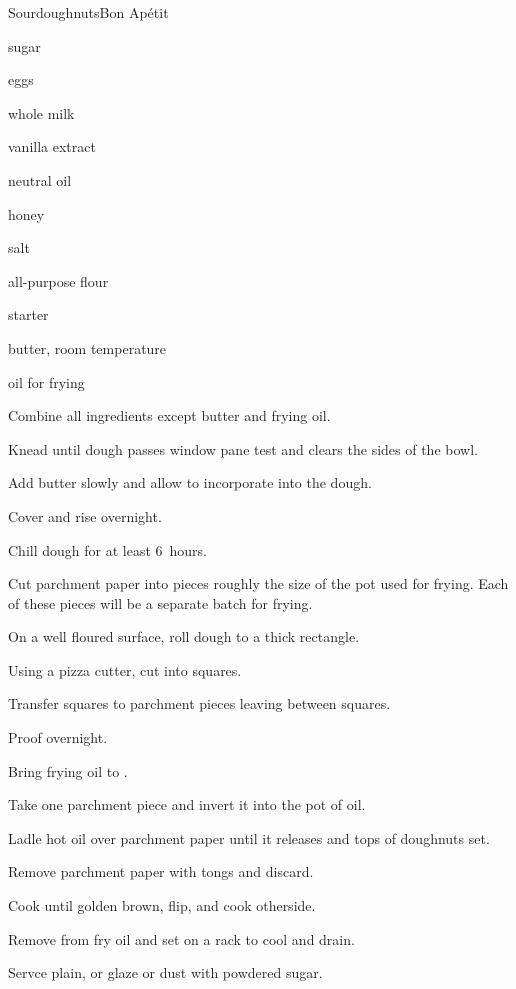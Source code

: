 \begin{recipe}{Sourdoughnuts}{Bon Ap\'etit}{}

\begin{ingredients}
\item {} sugar
\item {} eggs
\item {} whole milk
\item {} vanilla extract
\item \Tp{1\half} neutral oil
\item {} honey
\item {} salt
\item {} all-purpose flour
\item {} starter
\item {} butter, room temperature
\item oil for frying
\end{ingredients}

\begin{directions}
\item Combine all ingredients except butter and frying oil.
\item Knead until dough passes window pane test and clears the sides of the bowl.
\item Add butter slowly and allow to incorporate into the dough.
\item Cover and rise overnight.
\item Chill dough for at least 6~hours.
\item Cut parchment paper into pieces roughly the size of the pot used for frying. Each of these pieces will be a separate batch for frying.
\item On a well floured surface, roll dough to a \inch{\quarter} thick rectangle.
\item Using a pizza cutter, cut into  squares.
\item Transfer squares to parchment pieces leaving  between squares.
\item Proof overnight.
\item Bring frying oil to .
\item Take one parchment piece and invert it into the pot of oil.
\item Ladle hot oil over parchment paper until it releases and tops of doughnuts set.
\item Remove parchment paper with tongs and discard.
\item Cook until golden brown, flip, and cook otherside.
\item Remove from fry oil and set on a rack to cool and drain.
\item Servce plain, or glaze or dust with powdered sugar.
\end{directions}

\end{recipe}
